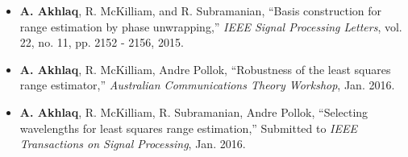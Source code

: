  \label{Publications}
\begin{itemize}
\item{\textbf{A. Akhlaq}, R. McKilliam, and R. Subramanian, ``Basis construction for range estimation by phase unwrapping,'' \textit{IEEE Signal Processing Letters}, vol. 22, no. 11, pp. 2152 - 2156, 2015.}
\item{\textbf{A. Akhlaq}, R. McKilliam, Andre Pollok, ``Robustness of the least squares range estimator,'' \textit{Australian Communications Theory Workshop}, Jan. 2016.}
\item{\textbf{A. Akhlaq}, R. McKilliam, R. Subramanian, Andre Pollok, ``Selecting wavelengths for least squares range estimation,'' Submitted to \textit{IEEE Transactions on Signal Processing}, Jan. 2016.}
\end{itemize}
